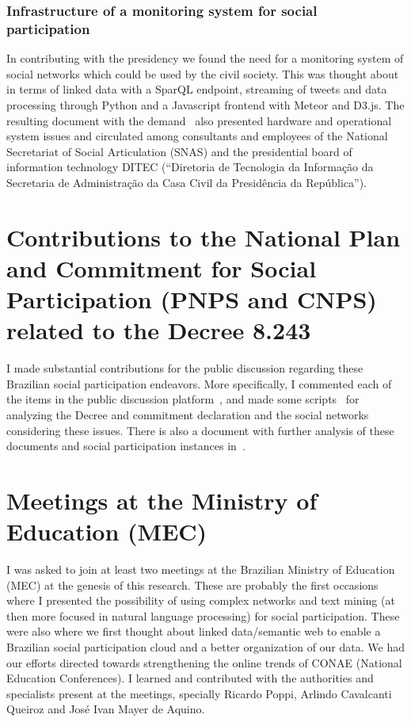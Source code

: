\begin{apendicesenv}
\subsubsection{Infrastructure of a monitoring system for social participation}\label{sec:monitoring}
In contributing with the presidency we found the need for a monitoring system of social networks
which could be used by the civil society.
This was thought about in terms of linked data with a SparQL endpoint, streaming of tweets and data processing through Python
and a Javascript frontend with Meteor and D3.js.
The resulting document with the demand~\cite{sm} also presented hardware and operational system issues
and circulated among consultants and employees of the National Secretariat of Social Articulation (SNAS) and 
the presidential board of information technology DITEC (``Diretoria de Tecnologia da Informação da Secretaria de Administração da Casa Civil da Presidência da República'').

\section{Contributions to the National Plan and Commitment for Social Participation (PNPS and CNPS) related to the Decree 8.243}
I made substantial contributions for the public discussion regarding these Brazilian social participation
endeavors.
More specifically, I commented each of the items in the public discussion platform~\cite{participaPNPS},
and made some scripts~\cite{analisePNPS,pcPS} for analyzing the Decree and commitment declaration and the social networks considering these issues.
There is also a document with further analysis of these documents and social participation instances in~\cite{lmPS}.

\section{Meetings at the Ministry of Education (MEC)}
I was asked to join at least two meetings at the Brazilian Ministry of Education (MEC)
at the genesis of this research.
These are probably the first occasions where I presented the possibility of using
complex networks and text mining (at then more focused in natural language processing)
for social participation.
These were also where we first thought about linked data/semantic web to enable a
Brazilian social participation cloud and a better organization of our data.
We had our efforts directed towards strengthening the online trends of CONAE (National Education Conferences).
I learned and contributed with the authorities and specialists present at the meetings,
specially Ricardo Poppi, Arlindo Cavalcanti Queiroz and José Ivan Mayer de Aquino.


\end{apendicesenv}
